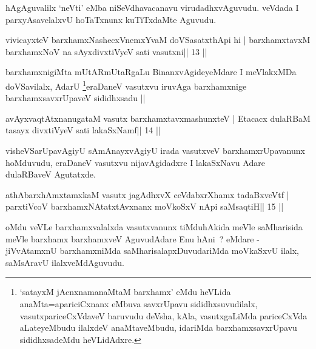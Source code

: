 \begin{artha}
hAgAguvalilx `neVti' eMba niSeVdhavacanavu virudadhxvAguvudu. veVdada I parxyAsavelalxvU hoTaTxnunx kuTiTxdaMte Aguvudu.
\end{artha}


\begin{shl}
vivicayxteV barxhamxNashecxVnemxYvaM doVSasatxthA\s pi hi |
barxhamxtavxM barxhamxNoV na sAyxdivxtiVyeV sati vasutxni\hfill || 13 ||
\end{shl}

\begin{artha}
barxhamxnigiMta mUtARmUtaRgaLu BinanxvAgideyeMdare I meVlakxMDa
doVSavilalx, AdarU \footnote[1]{`satayxM jAcnxnamanaMtaM barxhamx'
  eMdu heVLida anaMta=apariciCxnanx eMbuva savxrUpavu
  sididhxsuvudilalx, vasutxpariceCxVdaveV baruvudu deVsha, kAla,
  vasutxgaLiMda pariceCxVda aLateyeMbudu ilalxdeV anaMtaveMbudu,
  idariMda barxhamxsavxrUpavu sididhxsadeMdu heVLidAdxre.}eraDaneV 
  vasutxvu iruvAga barxhamxnige barxhamxsavxrUpaveV sididhxsadu ||
\end{artha}


\begin{shl}
avAyxvaqtAtxnanugataM vasutx barxhamxtavxmashunxteV |
Etacacx dulaRBaM tasayx divxtiVyeV sati lakaSxNamf\hfill || 14 ||
\end{shl}

\begin{artha}
visheVSarUpavAgiyU sAmAnayxvAgiyU irada vasutxveV barxhamxrUpavanunx hoMduvudu, eraDaneV vasutxvu nijavAgidadxre I lakaSxNavu Adare dulaRBaveV Agutatxde.
\end{artha}


\begin{shl}
athAbarxhAmxtamxkaM vasutx jagAdhxvX ceVdabxrXhamx tadaBxveVtf |
parxtiVcoV barxhamxNA\s tatxtAvxnanx moVkoSxV nApi saMsaqtiH\hfill || 15 ||
\end{shl}

\begin{artha}
oMdu veVLe barxhamxvalalxda vasutxvanunx tiMduhAkida meVle saMharisida meVle barxhamx barxhamxveV AguvudAdare Enu hAni~? eMdare - jiVvAtamxnU barxhamxniMda saMharisalapxDuvudariMda moVkaSxvU ilalx, saMsAravU ilalxveMdAguvudu.
\end{artha}

